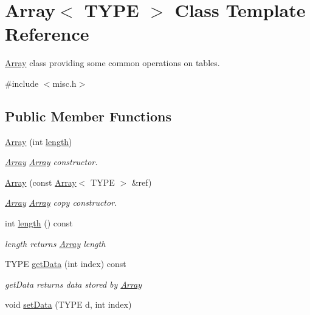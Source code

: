 \hypertarget{classArray}{}\section{Array$<$ T\+Y\+P\+E $>$ Class Template Reference}
\label{classArray}


\hyperlink{classArray}{Array} class providing some common operations on tables.  




{\ttfamily \#include $<$misc.\+h$>$}

\subsection*{Public Member Functions}
\begin{DoxyCompactItemize}
\item 
\hyperlink{classArray_ae135878c586419c57baf3edf7fa0fe21}{Array} (int \hyperlink{classArray_a3a088222b444a20f1d926ee7b44fa868}{length})
\begin{DoxyCompactList}\small\item\em \hyperlink{classArray}{Array} \hyperlink{classArray}{Array} constructor. \end{DoxyCompactList}\item 
\hyperlink{classArray_a9307cd54f769f06cd738443f3ddaeb0a}{Array} (const \hyperlink{classArray}{Array}$<$ T\+Y\+P\+E $>$ \&ref)
\begin{DoxyCompactList}\small\item\em \hyperlink{classArray}{Array} \hyperlink{classArray}{Array} copy constructor. \end{DoxyCompactList}\item 
int \hyperlink{classArray_a3a088222b444a20f1d926ee7b44fa868}{length} () const 
\begin{DoxyCompactList}\small\item\em length returns \hyperlink{classArray}{Array} length \end{DoxyCompactList}\item 
T\+Y\+P\+E \hyperlink{classArray_a185f77a5e5fec186718b41c6f97cf901}{get\+Data} (int index) const 
\begin{DoxyCompactList}\small\item\em get\+Data returns data stored by \hyperlink{classArray}{Array} \end{DoxyCompactList}\item 
void \hyperlink{classArray_a518c03f5920deccc1b084fb8a919a34f}{set\+Data} (T\+Y\+P\+E d, int index)

\end{DoxyCompactItemize}
